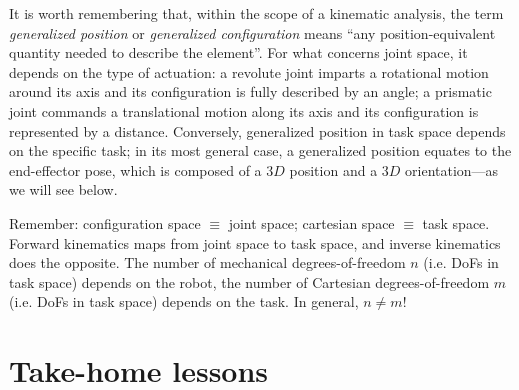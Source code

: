 It is worth remembering that, within the scope of a kinematic analysis, the term \textsl{generalized position} or \textsl{generalized configuration} means ``any position-equivalent quantity needed to describe the element''.
For what concerns joint space, it depends on the type of actuation: a revolute joint imparts a rotational motion around its axis and its configuration is fully described by an angle; a prismatic joint commands a translational motion along its axis and its configuration is represented by a distance.
Conversely, generalized position in task space depends on the specific task; in its most general case, a generalized position equates to the end-effector pose, which is composed of a $3D$ position and a $3D$ orientation---as we will see below.

\begin{mdframed}
\noindent Remember:
configuration space $\equiv$ joint space;
cartesian space $\equiv$ task space.
Forward kinematics maps from joint space to task space, and inverse kinematics does the opposite.
The number of mechanical degrees-of-freedom $n$ (i.e. DoFs in task space) depends on the robot, the number of Cartesian degrees-of-freedom $m$ (i.e. DoFs in task space) depends on the task. In general, $n \neq m$!
\end{mdframed}








\section*{Take-home lessons}

